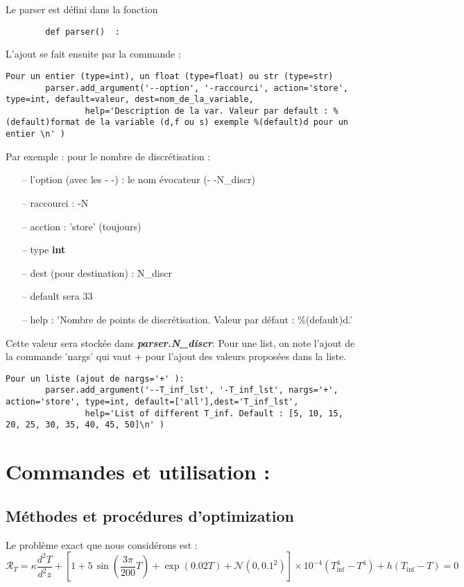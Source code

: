 \documentclass[a4paper,12pt]{article}
\newcommand{\bepar}[1]{
	\left( #1 \right)  
}
\newcommand{\becro}[1]{
	\left[ #1 \right]  
}
\newcommand\bk{\color{black}}
\newcommand\brick{\color{brick}}
\numberwithin{equation}{section} %
\begin{document}
\noindent Le parser est défini dans la fonction 
\begin{lstlisting} 
		def parser()  :
\end{lstlisting}
L'ajout se fait ensuite par la commande :
\begin{lstlisting}                
Pour un entier (type=int), un float (type=float) ou str (type=str)
		parser.add_argument('--option', '-raccourci', action='store', type=int, default=valeur, dest=nom_de_la_variable, 
                help='Description de la var. Valeur par default : %(default)format de la variable (d,f ou s) exemple %(default)d pour un entier \n' )
\end{lstlisting}
Par exemple : pour le nombre de discrétisation : 
\begin{enumerate}[leftmargin=2cm]
\item[--] l'option (avec les - -) : le nom évocateur (- -N\_discr)
\item[--] raccourci : -N
\item[--] acction : 'store' (toujours)
\item[--] type \textbf{int}
\item[--] dest (pour destination) :  N\_discr
\item[--] default sera 33
\item[--] help : 'Nombre de points de discrétisation. Valeur par défaut : \%(default)d.' 
\end{enumerate}

 \noindent Cette valeur sera stockée dans \textbf{\textit{parser.N\_discr}}.
Pour une list, on note l'ajout de la commande 'nargs' qui vaut + pour l'ajout des valeurs proposées dans la liste.
\begin{lstlisting}    	        
Pour un liste (ajout de nargs='+' ):
		parser.add_argument('--T_inf_lst', '-T_inf_lst', nargs='+', action='store', type=int, default=['all'],dest='T_inf_lst', 
                help='List of different T_inf. Default : [5, 10, 15, 20, 25, 30, 35, 40, 45, 50]\n' )
\end{lstlisting}

\section*{Commandes et utilisation :}
\brick \subsection*{Méthodes et  procédures d'optimization} \bk
\noindent Le problème exact que nous considérons est :
\begin{equation}
\mathcal{R}_T = \kappa \frac{d^2T}{d^2z} + \becro{1 + 5\, \sin{\bepar{\frac{3\pi}{200} T}} +\exp{\left(0.02T\right)} + \mathcal{N}\left( 0,0.1^2\right)} \times 10^{-4} \bepar{T_{\text{inf}}^4 - T^4} + h \bepar{T_{\text{inf}} - T} = 0 \label{pro_ex}
\end{equation}
\end{document}
